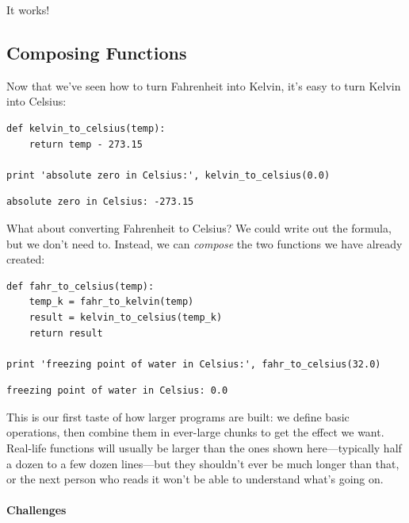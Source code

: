 \documentclass[]{book}
\newcommand{\gdef}[2]{\emph{#2}}
\begin{document}
It works!

\subsection{Composing Functions}

Now that we've seen how to turn Fahrenheit into Kelvin, it's easy to
turn Kelvin into Celsius:

\begin{verbatim}
def kelvin_to_celsius(temp):
    return temp - 273.15

print 'absolute zero in Celsius:', kelvin_to_celsius(0.0)
\end{verbatim}

\begin{verbatim}
absolute zero in Celsius: -273.15
\end{verbatim}

What about converting Fahrenheit to Celsius? We could write out the
formula, but we don't need to. Instead, we can
\gdef{g:function-composition}{compose} the two functions we have
already created:

\begin{verbatim}
def fahr_to_celsius(temp):
    temp_k = fahr_to_kelvin(temp)
    result = kelvin_to_celsius(temp_k)
    return result

print 'freezing point of water in Celsius:', fahr_to_celsius(32.0)
\end{verbatim}

\begin{verbatim}
freezing point of water in Celsius: 0.0
\end{verbatim}

This is our first taste of how larger programs are built: we define
basic operations, then combine them in ever-large chunks to get the
effect we want. Real-life functions will usually be larger than the ones
shown here---typically half a dozen to a few dozen lines---but they
shouldn't ever be much longer than that, or the next person who reads it
won't be able to understand what's going on.

\mbox{}\paragraph{Challenges}
\end{document}
